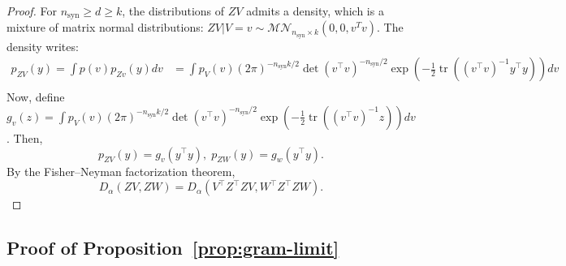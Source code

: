\documentclass{article}
\theoremstyle{plain}
\theoremstyle{definition}
\theoremstyle{remark}
\DeclareMathOperator{\tr}{tr}
\begin{document}
\begin{proof}
    For $n_{\text{syn}} \geq d \geq k$, the distributions of $ZV$ admits a density, which is a mixture of matrix normal distributions: $ZV | V=v \sim \mathcal{MN}_{n_{\text{syn}} \times k} (0, 0, v^T v)$. The density writes:
    \begin{align*}
        p_{ZV}(y) = \int  p(v) p_{Zv}(y) dv &= \int  p_V(v) (2\pi)^{- n_{\text{syn}} k /2} \det\left(v^\top v\right)^{-n_{\text{syn}}/2} \exp\left(-\frac{1}{2} \tr\left((v^\top v)^{-1}y^\top y\right)\right) dv\\
    \end{align*}
    Now, define $g_v(z) = \int  p_V(v) (2\pi)^{- n_{\text{syn}} k /2} \det\left(v^\top v\right)^{-n_{\text{syn}}/2} \exp\left(-\frac{1}{2} \tr\left((v^\top v)^{-1} z\right)\right) dv$. Then, \[p_{ZV}(y) = g_v(y^\top y) , \; p_{ZW}(y) = g_w(y^\top y).\]
    By the Fisher–Neyman factorization theorem, 
    \[D_\alpha(ZV,ZW) = D_\alpha(V^\top Z^\top Z V, W^\top Z^\top Z W).\]
\end{proof}

\subsection{Proof of Proposition~\ref{prop:gram-limit}}
\label{app:prop-gram-limit}

\propGramLimit*
\end{document}
